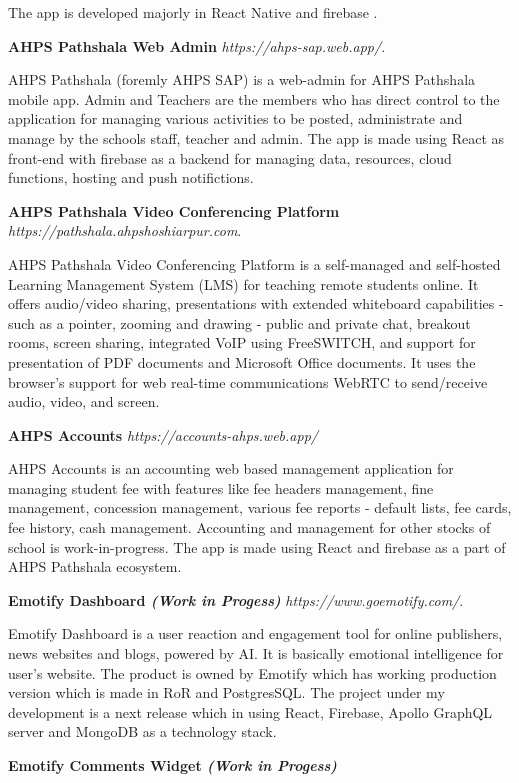 \documentclass[margin,line]{res}
\begin{document}
\begin{resume}
The app is developed majorly in React Native and firebase .

\textbf{AHPS Pathshala Web Admin} {\em https://ahps-sap.web.app/}.

AHPS Pathshala (foremly AHPS SAP) is a web-admin for AHPS Pathshala mobile app. Admin and Teachers are the members who has direct control to the application for managing various activities to be posted, administrate and manage by the schools staff, teacher and admin. The app is made using React as front-end with firebase as a backend for managing data, resources, cloud functions, hosting and push notifictions.

\textbf{AHPS Pathshala Video Conferencing Platform} {\em https://pathshala.ahpshoshiarpur.com}.

AHPS Pathshala Video Conferencing Platform is a self-managed and self-hosted Learning Management System (LMS) for teaching remote students online.  It offers audio/video sharing, presentations with extended whiteboard capabilities - such as a pointer, zooming and drawing - public and private chat, breakout rooms, screen sharing, integrated VoIP using FreeSWITCH, and support for presentation of PDF documents and Microsoft Office documents. It uses the browser's support for web real-time communications WebRTC to send/receive audio, video, and screen. 

\textbf{AHPS Accounts} {\em https://accounts-ahps.web.app/}

AHPS Accounts is an accounting web based management application for managing student fee with features like fee headers management, fine management, concession management, various fee reports - default lists, fee cards, fee history, cash management. Accounting and management for other stocks of school is work-in-progress. The app is made using React and firebase as a part of AHPS Pathshala ecosystem.

\textbf{Emotify Dashboard \em (Work in Progess)} {\em https://www.goemotify.com/}. 

Emotify Dashboard is a user reaction and engagement tool for online publishers, news websites and blogs, powered by AI. It is basically emotional intelligence for user's website. The product is owned by Emotify which has working production version which is made in RoR and PostgresSQL. The project under my development is a next release which in using React, Firebase, Apollo GraphQL server and MongoDB as a technology stack.

\textbf{Emotify Comments Widget \em (Work in Progess)}


\end{resume}
\end{document}
